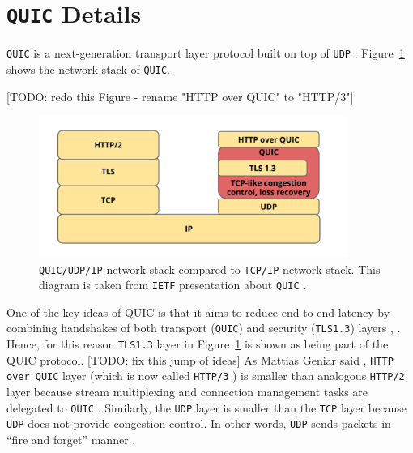 \documentclass[12pt,a4paper,twoside,openright]{report}
\begin{document}
\section{\texttt{QUIC} Details}

\texttt{QUIC} is a next-generation transport layer protocol built on top of \texttt{UDP} \cite{chromium_blog_about_quic}.
Figure~\ref{fig:QUIC_network_stack} shows the network stack of \texttt{QUIC}.

[TODO: redo this Figure - rename "HTTP over QUIC" to "HTTP/3"]
    \begin{figure}[ht]
    \centering
    \includegraphics[width=0.9\textwidth]{figs/QUIC_network_stack.PNG}
    \caption{\texttt{QUIC/UDP/IP} network stack compared to \texttt{TCP/IP} network stack. This diagram is taken from \texttt{IETF} presentation about \texttt{QUIC} \cite{IETF_presentation_about_QUIC}.}
    \label{fig:QUIC_network_stack}
    \end{figure}

One of the key ideas of QUIC is that it aims to reduce end-to-end latency by combining handshakes of both transport (\texttt{QUIC}) and security (\texttt{TLS1.3}) layers \cite{Google_QUIC_protocol_moving_the_web_from_TCP_to_UDP}, \cite{HTTP_3_the_past_the_present_and_the_future}. Hence, for this reason \texttt{TLS1.3} layer in Figure~\ref{fig:QUIC_network_stack} is shown as being part of the QUIC protocol. 
[TODO: fix this jump of ideas]
As Mattias Geniar said \cite{Google_QUIC_protocol_moving_the_web_from_TCP_to_UDP},
\texttt{HTTP over QUIC} layer (which is now called \texttt{HTTP/3} \cite{HTTP_3_the_past_the_present_and_the_future}) is smaller than analogous \texttt{HTTP/2} layer because stream multiplexing and connection management tasks are delegated to \texttt{QUIC} \cite{bib_grigorik2013}.
Similarly, the \texttt{UDP} layer is smaller than the \texttt{TCP} layer because \texttt{UDP} does not provide congestion control. 
In other words, \texttt{UDP} sends packets in \enquote{fire and forget} manner \cite{Google_QUIC_protocol_moving_the_web_from_TCP_to_UDP}.
\end{document}
